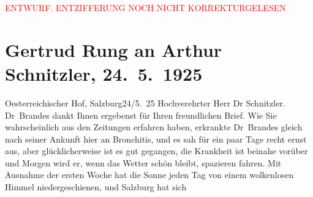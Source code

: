 
\begin{center}
            \textcolor{red}{ENTWURF. ENTZIFFERUNG NOCH NICHT KORREKTURGELESEN}
                      \end{center}
            
               \section[Gertrud Rung an Arthur Schnitzler, 24. 5. 1925]{ Gertrud Rung an Arthur Schnitzler, 24. 5. 1925}\nopagebreak{}\rehead{ }\begin{ledgroupsized}[t]{13cm}\normalsize\beginnumbering{} \toendnotes[C]{\smallbreak\pagebreak[2]} 
\pstart
           \raggedleft{}{\pb}Oesterreichischer Hof, Salzburg24/5. 25\pend
           \pstart{}Hochverehrter Herr Dr Schnitzler.\pend\pstart
           Dr Brandes dankt Ihnen ergebenst für Ihren
                    freundlichen Brief. Wie Sie wahrscheinlich aus den Zeitungen erfahren haben,
                    erkrankte Dr Brandes gleich nach seiner
                    Ankunft hier an Bronchitis, und es sah für ein paar Tage recht ernst aus, aber
                    glücklicherweise ist es gut gegangen, die Krankheit ist beinahe vorüber und
                    Morgen {\pb}wird er, wenn das
                    Wetter schön bleibt, spazieren fahren.\pend
           \pstart
           Mit Ausnahme der ersten Woche hat die Sonne jeden Tag von einem wolkenlosen
                    Himmel niedergeschienen, und Salzburg hat sich

\end{ledgroupsized}
